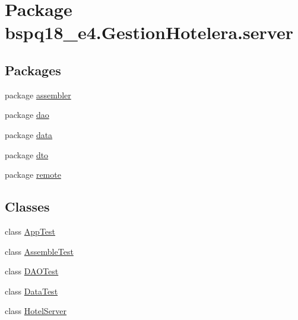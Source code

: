 \hypertarget{namespacebspq18__e4_1_1_gestion_hotelera_1_1server}{}\section{Package bspq18\+\_\+e4.\+Gestion\+Hotelera.\+server}
\label{namespacebspq18__e4_1_1_gestion_hotelera_1_1server}
\subsection*{Packages}
\begin{DoxyCompactItemize}
\item 
package \mbox{\hyperlink{namespacebspq18__e4_1_1_gestion_hotelera_1_1server_1_1assembler}{assembler}}
\item 
package \mbox{\hyperlink{namespacebspq18__e4_1_1_gestion_hotelera_1_1server_1_1dao}{dao}}
\item 
package \mbox{\hyperlink{namespacebspq18__e4_1_1_gestion_hotelera_1_1server_1_1data}{data}}
\item 
package \mbox{\hyperlink{namespacebspq18__e4_1_1_gestion_hotelera_1_1server_1_1dto}{dto}}
\item 
package \mbox{\hyperlink{namespacebspq18__e4_1_1_gestion_hotelera_1_1server_1_1remote}{remote}}
\end{DoxyCompactItemize}
\subsection*{Classes}
\begin{DoxyCompactItemize}
\item 
class \mbox{\hyperlink{classbspq18__e4_1_1_gestion_hotelera_1_1server_1_1_app_test}{App\+Test}}
\item 
class \mbox{\hyperlink{classbspq18__e4_1_1_gestion_hotelera_1_1server_1_1_assemble_test}{Assemble\+Test}}
\item 
class \mbox{\hyperlink{classbspq18__e4_1_1_gestion_hotelera_1_1server_1_1_d_a_o_test}{D\+A\+O\+Test}}
\item 
class \mbox{\hyperlink{classbspq18__e4_1_1_gestion_hotelera_1_1server_1_1_data_test}{Data\+Test}}
\item 
class \mbox{\hyperlink{classbspq18__e4_1_1_gestion_hotelera_1_1server_1_1_hotel_server}{Hotel\+Server}}
\end{DoxyCompactItemize}

